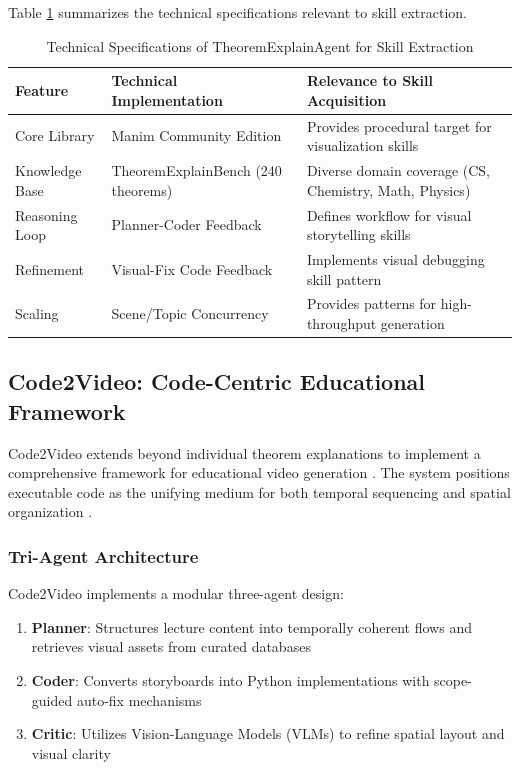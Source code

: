 \documentclass[11pt,a4paper]{article}
\begin{document}
Table \ref{tab:tea} summarizes the technical specifications relevant to skill extraction.

\begin{table}[htp]
\centering
\caption{Technical Specifications of TheoremExplainAgent for Skill Extraction}
\label{tab:tea}
\begin{tabular}{@{}p{3.5cm}p{5cm}p{5.5cm}@{}}
\toprule
\textbf{Feature} & \textbf{Technical Implementation} & \textbf{Relevance to Skill Acquisition} \\
\midrule
Core Library & Manim Community Edition & Provides procedural target for visualization skills \cite{github2024tea} \\
Knowledge Base & TheoremExplainBench (240 theorems) & Diverse domain coverage (CS, Chemistry, Math, Physics) \cite{teaproject2024} \\
Reasoning Loop & Planner-Coder Feedback & Defines workflow for visual storytelling skills \cite{arxivpdf2024tea, arxiv2024visualstory} \\
Refinement & Visual-Fix Code Feedback & Implements visual debugging skill pattern \cite{github2024tea} \\
Scaling & Scene/Topic Concurrency & Provides patterns for high-throughput generation \cite{github2024tea} \\
\bottomrule
\end{tabular}
\end{table}

\subsection{Code2Video: Code-Centric Educational Framework}\label{sec:code2video}

Code2Video extends beyond individual theorem explanations to implement a comprehensive framework for educational video generation \cite{arxiv2024code2video}. The system positions executable code as the unifying medium for both temporal sequencing and spatial organization \cite{arxiv2024code2video, arxivpdf2024code2video}.

\subsubsection{Tri-Agent Architecture}

Code2Video implements a modular three-agent design:

\begin{enumerate}
\item \textbf{Planner}: Structures lecture content into temporally coherent flows and retrieves visual assets from curated databases \cite{arxiv2024code2video, github2024code2video, arxivpdf2024code2video}
\item \textbf{Coder}: Converts storyboards into Python implementations with scope-guided auto-fix mechanisms \cite{arxiv2024code2video, huggingface2024code2video}
\item \textbf{Critic}: Utilizes Vision-Language Models (VLMs) to refine spatial layout and visual clarity \cite{arxiv2024code2video}
\end{enumerate}
\end{document}
